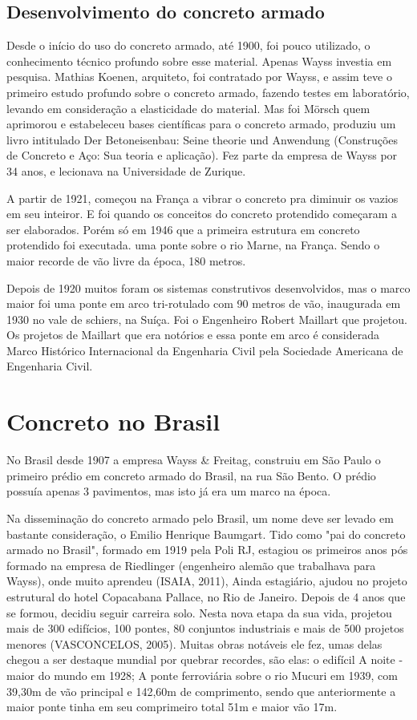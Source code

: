 \subsection{Desenvolvimento do concreto armado}

Desde o início do uso do concreto armado, até 1900, foi pouco utilizado, o conhecimento técnico profundo sobre esse material. Apenas Wayss investia em pesquisa. Mathias Koenen, arquiteto, foi contratado por Wayss, e assim teve o primeiro estudo profundo sobre o concreto armado, fazendo testes em laboratório, levando em consideração a elasticidade do material. Mas foi Mörsch quem aprimorou e estabeleceu bases científicas para o concreto armado, produziu um livro intitulado Der Betoneisenbau: Seine theorie und Anwendung (Construções de Concreto e Aço: Sua teoria e aplicação). Fez parte da empresa de Wayss por 34 anos, e lecionava na Universidade de Zurique.

A partir de 1921, começou na França a vibrar o concreto pra diminuir os vazios em seu inteiror. E foi quando os conceitos do concreto protendido começaram a ser elaborados. Porém só em 1946 que a primeira estrutura em concreto protendido foi executada. uma ponte sobre o rio Marne, na França. Sendo o maior recorde de vão livre da época, 180 metros.

Depois de 1920 muitos foram os sistemas construtivos desenvolvidos, mas o marco maior foi uma ponte em arco tri-rotulado com 90 metros de vão, inaugurada em 1930 no vale de schiers, na Suíça. Foi o Engenheiro Robert Maillart que projetou. Os projetos de Maillart que era notórios e essa ponte em arco é considerada Marco Histórico Internacional da Engenharia Civil pela Sociedade Americana de Engenharia Civil.

\section{Concreto no Brasil}

No Brasil desde 1907 a empresa Wayss & Freitag, construiu em São Paulo o primeiro prédio em concreto armado do Brasil, na rua São Bento. O prédio possuía apenas 3 pavimentos, mas isto já era um marco na época.

Na disseminação do concreto armado pelo Brasil, um nome deve ser levado em bastante consideração, o Emilio Henrique Baumgart. Tido como "pai do concreto armado no Brasil", formado em 1919 pela Poli RJ, estagiou os primeiros anos pós formado na empresa de Riedlinger (engenheiro alemão que trabalhava para Wayss), onde muito aprendeu (ISAIA, 2011), Ainda estagiário, ajudou no projeto estrutural do hotel Copacabana Pallace, no Rio de Janeiro. Depois de 4 anos que se formou, decidiu seguir carreira solo. Nesta nova etapa da sua vida, projetou mais de 300 edifícios, 100 pontes, 80 conjuntos industriais e mais de 500 projetos menores (VASCONCELOS, 2005). Muitas obras notáveis ele fez, umas delas chegou a ser destaque mundial por quebrar recordes, são elas: o edifícil A noite - maior do mundo em 1928; A ponte ferroviária sobre o rio Mucuri em 1939, com 39,30m de vão principal e 142,60m de comprimento, sendo que anteriormente a maior ponte tinha em seu comprimeiro total 51m e maior vão 17m.

